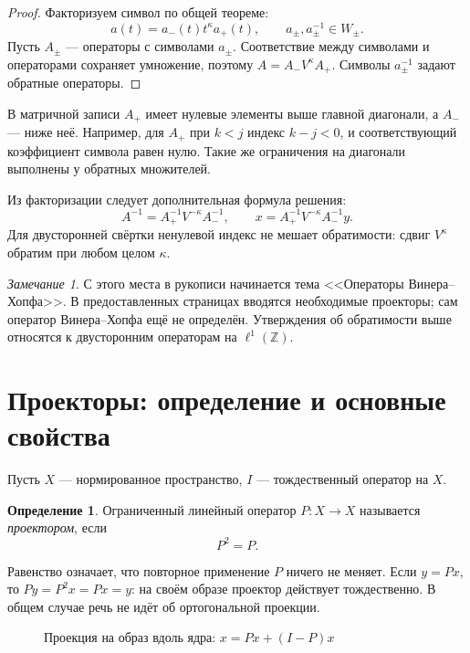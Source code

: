 \documentclass[12pt,a4paper]{article}
\theoremstyle{definition}
\newtheorem{definition}{Определение}
\theoremstyle{remark}
\newtheorem*{remark}{Замечание}
\newcommand{\ZZ}{\mathbb{Z}}
\begin{document}
\begin{proof}
Факторизуем символ по общей теореме:
\[
  a(t)=a_-(t)t^\kappa a_+(t),\qquad a_\pm,a_\pm^{-1}\in W_\pm.
\]
Пусть $A_\pm$ --- операторы с символами $a_\pm$. Соответствие
между символами и операторами сохраняет умножение, поэтому
$A=A_-V^\kappa A_+$. Символы $a_\pm^{-1}$ задают обратные операторы.
\end{proof}

В матричной записи $A_+$ имеет нулевые элементы выше главной диагонали,
а $A_-$ --- ниже неё. Например, для $A_+$ при $k<j$ индекс $k-j<0$,
и соответствующий коэффициент символа равен нулю.
Такие же ограничения на диагонали выполнены у обратных множителей.

Из факторизации следует дополнительная формула решения:
\[
  A^{-1}=A_+^{-1}V^{-\kappa}A_-^{-1},\qquad
  x=A_+^{-1}V^{-\kappa}A_-^{-1}y.
\]
Для двусторонней свёртки ненулевой индекс не мешает обратимости:
сдвиг $V^\kappa$ обратим при любом целом $\kappa$.

\begin{remark}
С этого места в рукописи начинается тема <<Операторы Винера--Хопфа>>.
В предоставленных страницах вводятся необходимые проекторы;
сам оператор Винера--Хопфа ещё не определён. Утверждения об обратимости
выше относятся к двусторонним операторам на $\ell^1(\ZZ)$.
\end{remark}

\section{Проекторы: определение и основные свойства}

Пусть $X$ --- нормированное пространство, $I$ --- тождественный
оператор на $X$.

\begin{definition}
Ограниченный линейный оператор $P\colon X\to X$ называется
\emph{проектором}, если
\[
  \boxed{P^2=P}.
\]
\end{definition}

Равенство означает, что повторное применение $P$ ничего не меняет.
Если $y=Px$, то $Py=P^2x=Px=y$: на своём образе проектор действует
тождественно. В общем случае речь не идёт об ортогональной проекции.

\begin{figure}[ht]
  \centering
  \caption{Проекция на образ вдоль ядра: $x=Px+(I-P)x$}
\end{figure}
\end{document}
